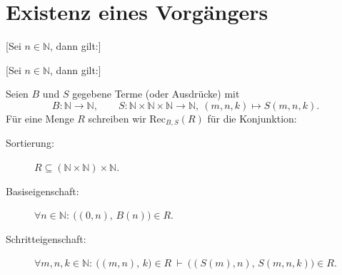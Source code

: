 \documentclass[main.tex]{subfiles}
\begin{document}
\section{Existenz eines Vorgängers}
[Sei \(n\in\mathbb{N}\), dann gilt:]
\begin{tabproof}


\end{tabproof}


[Sei \(n\in\mathbb{N}\), dann gilt:]
\begin{tabproof}

\end{tabproof}




\begin{definition}
Seien \(B\) und \(S\) gegebene Terme (oder Ausdrücke) mit
\[
B:\mathbb{N}\to\mathbb{N},\qquad 
S:\mathbb{N}\times\mathbb{N}\times\mathbb{N}\to\mathbb{N},\ (m,n,k)\mapsto S(m,n,k).
\]
Für eine Menge \(R\) schreiben wir \(\mathrm{Rec}_{B,S}(R)\) für die Konjunktion:
\begin{description}
  \item[Sortierung:] \(R \subseteq (\mathbb{N}\times\mathbb{N})\times\mathbb{N}\).
  \item[Basiseigenschaft:] \(\forall n\in\mathbb{N}:\ \bigl((0,n),\,B(n)\bigr)\in R\).
  \item[Schritteigenschaft:] \(\forall m,n,k\in\mathbb{N}:\ \bigl((m,n),\,k\bigr)\in R\ \vdash\ \bigl((S(m),n),\,S(m,n,k)\bigr)\in R\).
\end{description}
\end{definition}
\end{document}
